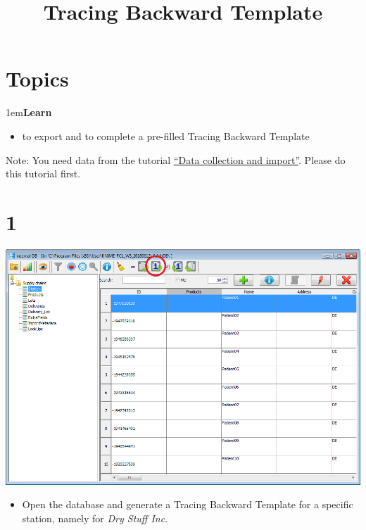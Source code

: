 \documentclass[10pt]{beamer}
\title{Tracing Backward Template}
\date{}
\begin{document}
\maketitle

\section{Topics}
\begin{frame}
\leftskip1em\textbf{Learn}
	\begin{itemize}
		\item to export and to complete a pre-filled Tracing Backward Template
	\end{itemize}
\vspace*{\fill}
Note: You need data from the tutorial \textcolor{blue}{\underline{\href{https://foodrisklabs.bfr.bund.de/data-collection-and-import/}{``Data collection and import''}}}. Please do this tutorial first.
\end{frame}

\section{1}
\begin{frame}
	\begin{center}
			\includegraphics[height=0.6\textheight]{1.png}
	\end{center}
	\begin{itemize}
		\item Open the database and generate a Tracing Backward Template for a specific station, namely for \textit{Dry Stuff Inc}.
	\end{itemize}
\end{frame}
\end{document}
